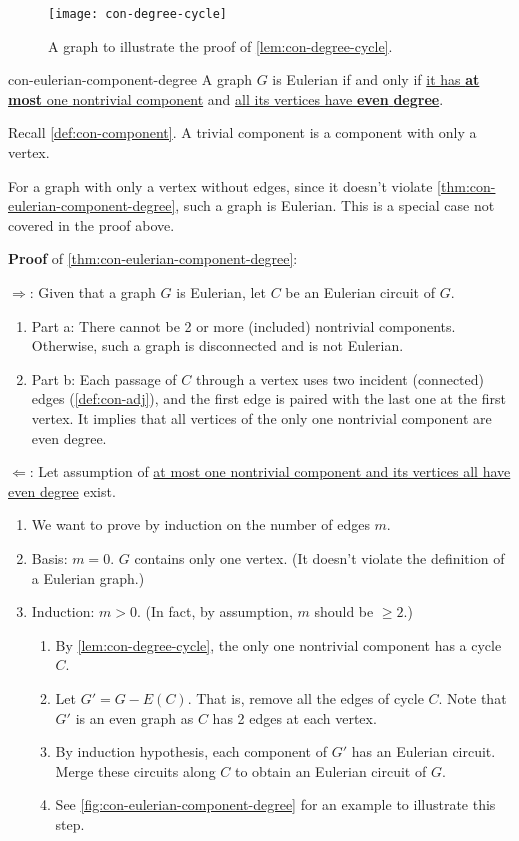 \documentclass[../src/handouts/main.tex]{subfiles}
\begin{document}
\begin{figure}[htbp]
  \centering
  \texttt{[image: con-degree-cycle]}
  \caption{A graph to illustrate the proof of \cref{lem:con-degree-cycle}.}
  \label{fig:con-degree-cycle}
\end{figure}

\begin{theorem}{}{con-eulerian-component-degree}
  A graph $G$ is Eulerian if and only if \ul{it has \textbf{at most} one nontrivial component} and \ul{all its vertices have \textbf{even} \textbf{degree}}. %
\end{theorem}

Recall \cref{def:con-component}. A trivial component is a component with only a vertex.

For a graph with only a vertex without edges, since it doesn't violate \cref{thm:con-eulerian-component-degree}, such a graph is Eulerian. This is a special case not covered in the proof above.

\textbf{Proof} of \cref{thm:con-eulerian-component-degree}:

$\Rightarrow$: Given that a graph $G$ is Eulerian, let $C$ be an Eulerian circuit of $G$.
\begin{enumerate}
  \item Part a: There cannot be 2 or more (included) nontrivial components. Otherwise, such a graph is disconnected and is not Eulerian.
  \item Part b: Each passage of $C$ through a vertex uses two incident (connected) edges (\cref{def:con-adj}), and the first edge is paired with the last one at the first vertex. It implies that all vertices of the only one nontrivial component are even degree.
\end{enumerate}

$\Leftarrow$: Let assumption of \underline{at most one nontrivial component and its vertices all have even degree} exist.
\begin{enumerate}
  \item We want to prove by induction on the number of edges $m$.
  \item Basis: $m = 0$. $G$ contains only one vertex. (It doesn't violate the definition of a Eulerian graph.)
  \item Induction: $m>0$. (In fact, by assumption, $m$ should be $\geq 2$.)
    \begin{enumerate}
      \item By \cref{lem:con-degree-cycle}, the only one nontrivial component has a cycle $C$.
      \item Let $G' = G - E(C)$. That is, remove all the edges of cycle $C$. Note that $G'$ is an even graph as $C$ has 2 edges at each vertex.
      \item By induction hypothesis, each component of $G'$ has an Eulerian circuit. Merge these circuits along $C$ to obtain an Eulerian circuit of $G$.
      \item See \cref{fig:con-eulerian-component-degree} for an example to illustrate this step.
    \end{enumerate}
\end{enumerate}
\end{document}
